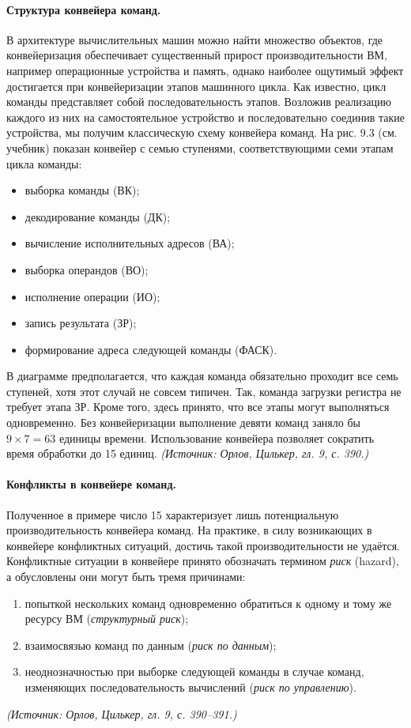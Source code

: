 \documentclass[a4paper,12pt]{article}
\begin{document}
\paragraph{Структура конвейера команд.}
В архитектуре вычислительных машин можно найти множество объектов, где конвейеризация обеспечивает существенный прирост производительности ВМ, например операционные устройства и память, однако наиболее ощутимый эффект достигается при конвейеризации этапов машинного цикла. Как известно, цикл команды представляет собой последовательность этапов. Возложив реализацию каждого из них на самостоятельное устройство и последовательно соединив такие устройства, мы получим классическую схему конвейера команд. На рис. 9.3 (см. учебник) показан конвейер с семью ступенями, соответствующими семи этапам цикла команды:
\begin{itemize}
\item выборка команды (ВК);
\item декодирование команды (ДК);
\item вычисление исполнительных адресов (ВА);
\item выборка операндов (ВО);
\item исполнение операции (ИО);
\item запись результата (ЗР);
\item формирование адреса следующей команды (ФАСК).
\end{itemize}
В диаграмме предполагается, что каждая команда обязательно проходит все семь ступеней, хотя этот случай не совсем типичен. Так, команда загрузки регистра не требует этапа ЗР. Кроме того, здесь принято, что все этапы могут выполняться одновременно. Без конвейеризации выполнение девяти команд заняло бы \(9\times7=63\) единицы времени. Использование конвейера позволяет сократить время обработки до 15 единиц.
\textit{(Источник: Орлов, Цилькер, гл. 9, с. 390.)}

\paragraph{Конфликты в конвейере команд.}
Полученное в примере число 15 характеризует лишь потенциальную производительность конвейера команд. На практике, в силу возникающих в конвейере конфликтных ситуаций, достичь такой производительности не удаётся. Конфликтные ситуации в конвейере принято обозначать термином \emph{риск} (hazard), а обусловлены они могут быть тремя причинами:
\begin{enumerate}[label=\arabic*)]
\item попыткой нескольких команд одновременно обратиться к одному и тому же ресурсу ВМ (\emph{структурный риск});
\item взаимосвязью команд по данным (\emph{риск по данным});
\item неоднозначностью при выборке следующей команды в случае команд, изменяющих последовательность вычислений (\emph{риск по управлению}).
\end{enumerate}
\textit{(Источник: Орлов, Цилькер, гл. 9, с. 390--391.)}
\end{document}
